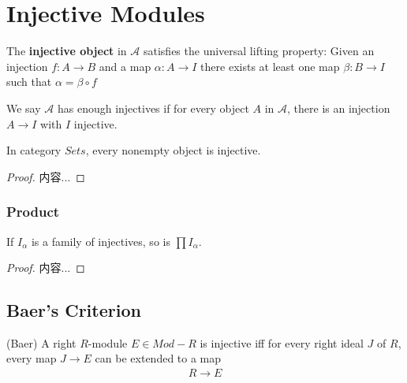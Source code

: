 \documentclass[Total.tex]{subfiles}
\begin{document}
		\section{Injective Modules}
			\begin{Def}
				The \textbf{injective object} in $\mathcal{A}$ satisfies the universal lifting property: Given an injection $f:A\rightarrow B$ and a map $\alpha:A\rightarrow I$ there exists at least one map $\beta:B\rightarrow I$ such that $\alpha=\beta\circ f$
				\begin{center}
				\end{center}
			\end{Def}
			
			We say $\mathcal{A}$ has enough injectives if for every object $A$ in $\mathcal{A}$, there is an injection $A\rightarrow I$ with $I$ injective. 
			
			\begin{proposition}
				In category $Sets$, every nonempty object is injective.
			\end{proposition}
			\begin{proof}
				内容...
			
			\end{proof}
			\subsubsection{Product}
			\begin{lemma}
				If $I_\alpha$ is a family of injectives, so is $\prod I_\alpha$.
			\end{lemma}
			\begin{proof}
				内容...
			\end{proof}
			
			\subsection{Baer's Criterion}
			\begin{theorem}
				(Baer) A right $R$-module $E\in Mod-R$ is injective iff for every right ideal $J$ of $R$, every map $J\rightarrow E$ can be extended to a map
				\begin{gather*}
					R\rightarrow E
				\end{gather*}
			\end{theorem}
			
\end{document}
